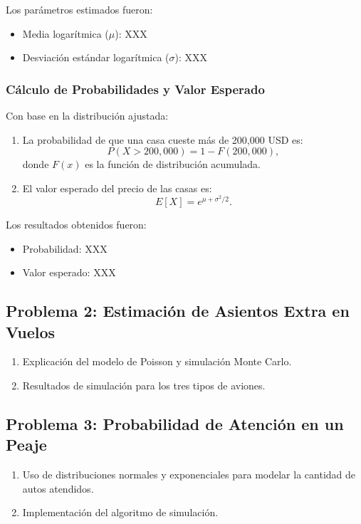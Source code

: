 \documentclass[12pt]{article}
\begin{document}
Los parámetros estimados fueron:
\begin{itemize}
    \item Media logarítmica ($\mu$): XXX
    \item Desviación estándar logarítmica ($\sigma$): XXX
\end{itemize}

\subsubsection{Cálculo de Probabilidades y Valor Esperado}
Con base en la distribución ajustada:
\begin{enumerate}
    \item La probabilidad de que una casa cueste más de 200,000 USD es:
    \[
    P(X > 200,000) = 1 - F(200,000),
    \]
    donde $F(x)$ es la función de distribución acumulada.
    \item El valor esperado del precio de las casas es:
    \[
    E[X] = e^{\mu + \sigma^2 / 2}.
    \]
\end{enumerate}

Los resultados obtenidos fueron:
\begin{itemize}
    \item Probabilidad: XXX
    \item Valor esperado: XXX
\end{itemize}


\subsection{Problema 2: Estimación de Asientos Extra en Vuelos}
\begin{enumerate}
    \item Explicación del modelo de Poisson y simulación Monte Carlo.
    \item Resultados de simulación para los tres tipos de aviones.
\end{enumerate}

\subsection{Problema 3: Probabilidad de Atención en un Peaje}
\begin{enumerate}
    \item Uso de distribuciones normales y exponenciales para modelar la cantidad de autos atendidos.
    \item Implementación del algoritmo de simulación.
\end{enumerate}
\end{document}
